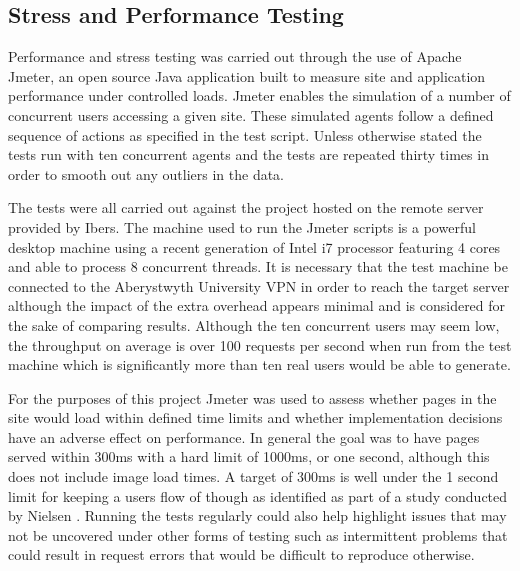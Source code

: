 \subsection{Stress and Performance Testing}

Performance and stress testing was carried out through the use of Apache Jmeter\cite{_jmeter}, an open source Java application built to measure site and application performance under controlled loads. Jmeter enables the simulation of a number of concurrent users accessing a given site. These simulated agents follow a defined sequence of actions as specified in the test script. Unless otherwise stated the tests run with ten concurrent agents and the tests are repeated thirty times in order to smooth out any outliers in the data.

The tests were all carried out against the project hosted on the remote server provided by Ibers. The machine used to run the Jmeter scripts is a powerful desktop machine using a recent generation of Intel i7 processor featuring 4 cores and able to process 8 concurrent threads. It is necessary that the test machine be connected to the Aberystwyth University VPN in order to reach the target server although the impact of the extra overhead appears minimal and is considered for the sake of comparing results. Although the ten concurrent users may seem low, the throughput on average is over 100 requests per second when run from the test machine which is significantly more than ten real users would be able to generate.

For the purposes of this project Jmeter was used to assess whether pages in the site would load within defined time limits and whether implementation decisions have an adverse effect on performance. In general the goal was to have pages served within 300ms with a hard limit of 1000ms, or one second, although this does not include image load times. A target of 300ms is well under the 1 second limit for keeping a users flow of though as identified as part of a study conducted by Nielsen \cite{responseTimes}. Running the tests regularly could also help highlight issues that may not be uncovered under other forms of testing such as intermittent problems that could result in request errors that would be difficult to reproduce otherwise.


